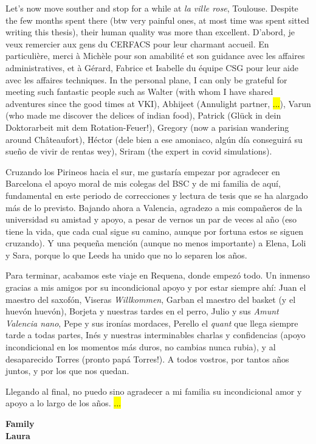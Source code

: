Let's now move souther and stop for a while at \textsl{la ville rose}, Toulouse. Despite the few months spent there (btw very painful ones, at most time was spent sitted writing this thesis), their human quality was more than excellent. D'abord, je veux remercier aux gens du CERFACS pour leur charmant accueil. En particulière, merci à Michèle pour son amabilité et son guidance avec les affaires administratives, et à Gérard, Fabrice et Isabelle du équipe CSG pour leur aide avec les affaires techniques. In the personal plane, I can only be grateful for meeting such fantastic people such as Walter (with whom I have shared adventures since the good times at VKI), Abhijeet (Annulight partner, \hl{...}), Varun (who made me discover the delices of indian food), Patrick (Glück in dein Doktorarbeit mit dem Rotation-Feuer!), Gregory (now a parisian wandering around Châteaufort), Héctor (dele bien a ese amoniaco, algún día conseguirá su sueño de vivir de rentas wey), Sriram (the expert in covid simulations).

Cruzando los Pirineos hacia el sur, me gustaría empezar por agradecer en Barcelona el apoyo moral de mis colegas del BSC y de mi familia de aquí, fundamental en este periodo de correcciones y lectura de tesis que se ha alargado más de lo previsto. Bajando ahora a Valencia, agradezo a mis compañeros de la universidad su amistad y apoyo, a pesar de vernos un par de veces al año (eso tiene la vida, que cada cual sigue su camino, aunque por fortuna estos se siguen cruzando). Y una pequeña mención (aunque no menos importante) a Elena, Loli y Sara, porque lo que Leeds ha unido que no lo separen los años. 

Para terminar, acabamos este viaje en Requena, donde empezó todo. Un inmenso gracias a mis amigos por su incondicional apoyo y por estar siempre ahí: Juan el maestro del saxofón, Viseras \textsl{Willkommen}, Garban el maestro del basket (y el huevón huevón), Borjeta y nuestras tardes en el perro, Julio y sus \textsl{Amunt Valencia nano}, Pepe y sus ironías mordaces, Perello el \textsl{quant} que llega siempre tarde a todas partes, Inés y nuestras interminables charlas y confidencias (apoyo incondicional en los momentos más duros, no cambias nunca rubia), y al desaparecido Torres (pronto papá Torres!). A todos vostros, por tantos años juntos, y por los que nos quedan.

Llegando al final, no puedo sino agradecer a mi familia su incondicional amor y apoyo a lo largo de los años. \hl{...}




\textbf{Family} \\


\textbf{Laura}


%

